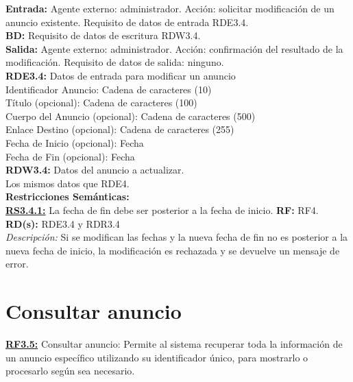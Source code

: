 \textbf{\textcolor{rojo}{Entrada:}} Agente externo: administrador. Acción: solicitar modificación de un anuncio existente. 
Requisito de datos de entrada \textcolor{azul}{RDE3.4}. \\[6pt]

\textbf{\textcolor{rojo}{BD:}} Requisito de datos de escritura \textcolor{azul}{RDW3.4}. \\[6pt]

\textbf{\textcolor{rojo}{Salida:}} Agente externo: administrador. Acción: confirmación del resultado de la modificación. 
Requisito de datos de salida: ninguno. \\[12pt]

\textcolor{azul}{\textbf{RDE3.4:}} Datos de entrada para modificar un anuncio \\
\hspace*{1cm} Identificador Anuncio: Cadena de caracteres (10) \\
\hspace*{1cm} Título (opcional): Cadena de caracteres (100) \\
\hspace*{1cm} Cuerpo del Anuncio (opcional): Cadena de caracteres (500) \\
\hspace*{1cm} Enlace Destino (opcional): Cadena de caracteres (255) \\
\hspace*{1cm} Fecha de Inicio (opcional): Fecha \\
\hspace*{1cm} Fecha de Fin (opcional): Fecha \\[12pt]

\textcolor{azul}{\textbf{RDW3.4:}} Datos del anuncio a actualizar. \\
\hspace*{1cm} Los mismos datos que RDE4. \\[12pt]


\textbf{\textcolor{verde}{Restricciones Semánticas:}} \\[6pt]
\textbf{\textcolor{verde}{\underline{RS3.4.1:}}} La fecha de fin debe ser posterior a la fecha de inicio. \textbf{RF:} RF4. \textbf{RD(s):} RDE3.4 y RDR3.4 \\
\hspace*{1cm} \textit{Descripción:} Si se modifican las fechas y la nueva fecha de fin no es posterior a la nueva fecha de inicio, la modificación es rechazada y se devuelve un mensaje de error.

\section{Consultar anuncio}
\textbf{\textcolor{rojo}{\underline{RF3.5:}}} Consultar anuncio: Permite al sistema recuperar toda la información de un anuncio específico utilizando su identificador único, para mostrarlo o procesarlo según sea necesario.\\[6pt]

